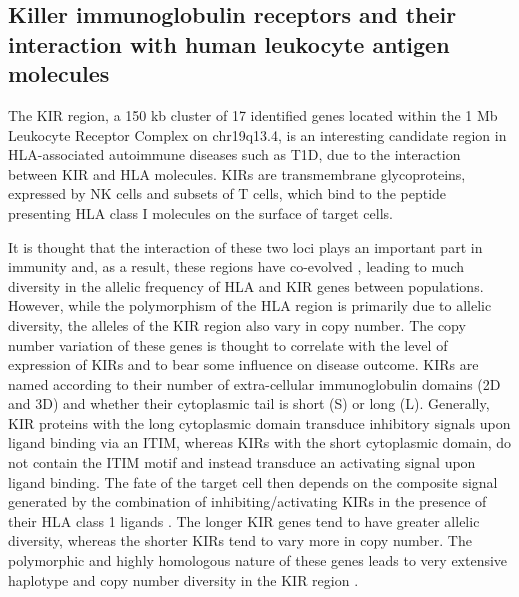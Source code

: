 \subsection{Killer immunoglobulin receptors and their interaction with human leukocyte antigen molecules}

The \gls{KIR} region, a 150 kb cluster of 17 identified genes located within the 1 Mb Leukocyte Receptor Complex on chr19q13.4,
is an interesting candidate region in HLA-associated autoimmune diseases such as \gls{T1D}, due to the interaction between \gls{KIR} and \gls{HLA} molecules.
\Glspl{KIR} are transmembrane glycoproteins, expressed by \gls{NK} cells and subsets of T cells,
which bind to the peptide presenting HLA class I molecules on the surface of target cells.

It is thought that the interaction of these two loci plays an important part in immunity and, as a result, these regions have co-evolved \citep{Parham:2013eb},
leading to much diversity in the allelic frequency of HLA and KIR genes between populations.
However, while the polymorphism of the HLA region is primarily due to allelic diversity, 
the alleles of the \gls{KIR} region also vary in copy number.
The copy number variation of these genes is thought to correlate with the level of expression of \glspl{KIR} and to bear some influence on disease outcome.
\Glspl{KIR} are named according to their number of extra-cellular immunoglobulin domains (2D and 3D) and whether their cytoplasmic tail is short (S) or long (L).  
Generally, KIR proteins with the long cytoplasmic domain transduce inhibitory signals upon ligand binding via an \gls{ITIM},
whereas KIRs with the short cytoplasmic domain, do not contain the \gls{ITIM} motif and instead transduce an activating signal upon ligand binding.  
The fate of the target cell then depends on the composite signal generated by the combination of inhibiting/activating KIRs in the presence of their HLA class 1 ligands \citep{Bashirova:2006dj}.
The longer KIR genes tend to have greater allelic diversity, whereas the shorter KIRs tend to vary more in copy number.
The polymorphic and highly homologous nature of these genes leads to very extensive haplotype and copy number diversity in the KIR region \citep{Jiang:2012cf}.

